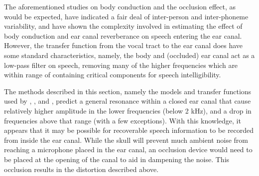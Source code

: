 \documentclass[dissertation,copyright]{uathesis}
\begin{document}
The aforementioned studies on body conduction and the occlusion effect, as would be expected, have indicated a fair deal of inter-person and inter-phoneme variability, and have shown the complexity involved in estimating the effect of body conduction and ear canal reverberance on speech entering the ear canal.  However, the transfer function from the vocal tract to the ear canal does have some standard characteristics, namely, the body and (occluded) ear canal act as a low-pass filter on speech, removing many of the higher frequencies which are within range of containing critical components for speech intelligibility.






The methods described in this section, namely the models and transfer functions used by \cite{hansen:97b}, \cite{stenfelt:07}, and \cite{reinfeldt:10}, predict a general resonance within a closed ear canal that cause relatively higher amplitude in the lower frequencies (below 2 kHz), and a drop in frequencies above that range (with a few exceptions).  With this knowledge, it appears that it may be possible for recoverable speech information to be recorded from inside the ear canal.  While the skull will prevent much ambient noise from reaching a microphone placed in the ear canal, an occlusion device would need to be placed at the opening of the canal to aid in dampening the noise.  This occlusion results in the distortion described above.
\end{document}
